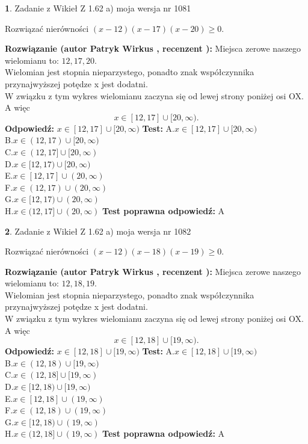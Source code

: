\documentclass[12pt, a4paper]{article}
\theoremstyle{definition} %
\newtheorem{zad}{}
\newcommand{\zadStart}[1]{\begin{zad}#1\newline}
\newcommand{\zadStop}{\end{zad}}
\newcommand{\rozwStart}[2]{\noindent \textbf{Rozwiązanie (autor #1 , recenzent #2): }\newline}
\newcommand{\rozwStop}{\newline}
\newcommand{\odpStart}{\noindent \textbf{Odpowiedź:}\newline}
\newcommand{\odpStop}{\newline}
\newcommand{\testStart}{\noindent \textbf{Test:}\newline}
\newcommand{\testStop}{\newline}
\newcommand{\kluczStart}{\noindent \textbf{Test poprawna odpowiedź:}\newline}
\newcommand{\kluczStop}{\newline}
\begin{document}
\zadStart{Zadanie z Wikieł Z 1.62 a) moja wersja nr 1081}

Rozwiązać nierówności $(x-12)(x-17)(x-20)\ge0$.
\zadStop
\rozwStart{Patryk Wirkus}{}
Miejsca zerowe naszego wielomianu to: $12, 17, 20$.\\
Wielomian jest stopnia nieparzystego, ponadto znak współczynnika przy\linebreak najwyższej potędze x jest dodatni.\\ W związku z tym wykres wielomianu zaczyna się od lewej strony poniżej osi OX. A więc $$x \in [12,17] \cup [20,\infty).$$
\rozwStop
\odpStart
$x \in [12,17] \cup [20,\infty)$
\odpStop
\testStart
A.$x \in [12,17] \cup [20,\infty)$\\
B.$x \in (12,17) \cup [20,\infty)$\\
C.$x \in (12,17] \cup [20,\infty)$\\
D.$x \in [12,17) \cup [20,\infty)$\\
E.$x \in [12,17] \cup (20,\infty)$\\
F.$x \in (12,17) \cup (20,\infty)$\\
G.$x \in [12,17) \cup (20,\infty)$\\
H.$x \in (12,17] \cup (20,\infty)$
\testStop
\kluczStart
A
\kluczStop



\zadStart{Zadanie z Wikieł Z 1.62 a) moja wersja nr 1082}

Rozwiązać nierówności $(x-12)(x-18)(x-19)\ge0$.
\zadStop
\rozwStart{Patryk Wirkus}{}
Miejsca zerowe naszego wielomianu to: $12, 18, 19$.\\
Wielomian jest stopnia nieparzystego, ponadto znak współczynnika przy\linebreak najwyższej potędze x jest dodatni.\\ W związku z tym wykres wielomianu zaczyna się od lewej strony poniżej osi OX. A więc $$x \in [12,18] \cup [19,\infty).$$
\rozwStop
\odpStart
$x \in [12,18] \cup [19,\infty)$
\odpStop
\testStart
A.$x \in [12,18] \cup [19,\infty)$\\
B.$x \in (12,18) \cup [19,\infty)$\\
C.$x \in (12,18] \cup [19,\infty)$\\
D.$x \in [12,18) \cup [19,\infty)$\\
E.$x \in [12,18] \cup (19,\infty)$\\
F.$x \in (12,18) \cup (19,\infty)$\\
G.$x \in [12,18) \cup (19,\infty)$\\
H.$x \in (12,18] \cup (19,\infty)$
\testStop
\kluczStart
A
\kluczStop
\end{document}
